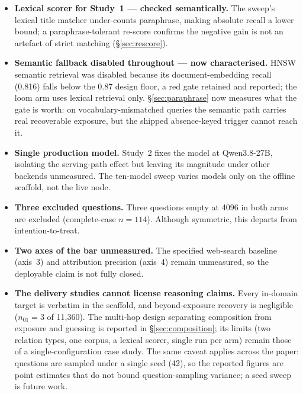 \documentclass[10pt,twocolumn]{article}
\begin{document}
\begin{itemize}[topsep=2pt,itemsep=2pt,leftmargin=1.4em]
\item \textbf{Lexical scorer for Study~1 --- checked semantically.} The sweep's lexical title matcher under-counts paraphrase, making absolute recall a lower bound; a paraphrase-tolerant re-score confirms the negative gain is not an artefact of strict matching (\S\ref{sec:rescore}).
\item \textbf{Semantic fallback disabled throughout --- now characterised.} HNSW semantic retrieval was disabled because its document-embedding recall (0.816) falls below the 0.87 design floor, a red gate retained and reported; the loom arm uses lexical retrieval only. \S\ref{sec:paraphrase} now measures what the gate is worth: on vocabulary-mismatched queries the semantic path carries real recoverable exposure, but the shipped absence-keyed trigger cannot reach it.
\item \textbf{Single production model.} Study~2 fixes the model at Qwen3.8-27B, isolating the serving-path effect but leaving its magnitude under other backends unmeasured. The ten-model sweep varies models only on the offline scaffold, not the live node.
\item \textbf{Three excluded questions.} Three questions empty at 4096 in both arms are excluded (complete-case $n=114$). Although symmetric, this departs from intention-to-treat.
\item \textbf{Two axes of the bar unmeasured.} The specified web-search baseline (axis~3) and attribution precision (axis~4) remain unmeasured, so the deployable claim is not fully closed.
\item \textbf{The delivery studies cannot license reasoning claims.} Every in-domain target is verbatim in the scaffold, and beyond-exposure recovery is negligible ($n_{01}=3$ of 11{,}360). The multi-hop design separating composition from exposure and guessing is reported in \S\ref{sec:composition}; its limits (two relation types, one corpus, a lexical scorer, single run per arm) remain those of a single-configuration case study. The same caveat applies across the paper: questions are sampled under a single seed (42), so the reported figures are point estimates that do not bound question-sampling variance; a seed sweep is future work.
\end{itemize}
\end{document}
